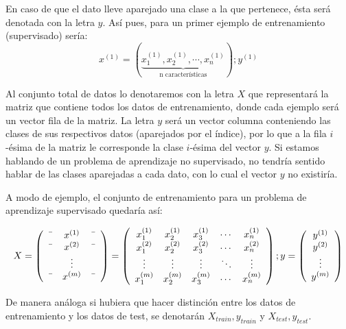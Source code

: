 En caso de que el dato lleve aparejado una clase a la que pertenece, ésta será denotada con la letra 
$y$. Así pues, para un primer ejemplo de entrenamiento (supervisado) sería:
$$ x^{(1)}=(\underbrace{x^{(1)}_1, x^{(1)}_2, \cdots, x^{(1)}_n}_{\text{n características}}); y^{(1)} $$

Al conjunto total de datos lo denotaremos con la letra $X$ que representará la matriz que contiene
todos los datos de entrenamiento, donde cada ejemplo será un vector fila de la matriz.
La letra $y$ será un vector columna conteniendo las clases de sus respectivos datos (aparejados por el índice), 
por lo que a la fila $i$-ésima de la matriz le corresponde la clase $i$-ésima del vector $y$.
Si estamos hablando de un problema de aprendizaje no supervisado, no tendría sentido hablar de las clases 
aparejadas a cada dato, con lo cual el vector $y$ no existiría.

A modo de ejemplo, el conjunto de entrenamiento para un problema de aprendizaje supervisado quedaría así:

$$
X = \left(\begin{array}{ccc}
    \textemdash & x^{(1)} & \textemdash \\
    \textemdash & x^{(2)} & \textemdash \\
     & \vdots &  \\
    \textemdash & x^{(m)} & \textemdash \\
\end{array}\right)
%
=
  \left(\begin{array}{ccccc}
    x^{(1)}_1 & x^{(1)}_2 & x^{(1)}_3 & \cdots & x^{(1)}_n \\
    x^{(2)}_1 & x^{(2)}_2 & x^{(2)}_3 & \cdots & x^{(2)}_n \\
    \vdots & \vdots & \vdots & \ddots & \vdots \\
    x^{(m)}_1 & x^{(m)}_2 & x^{(m)}_3 & \cdots & x^{(m)}_n \\
\end{array}\right)
%
;
y = \left(\begin{array}{c}
    y^{(1)} \\
    y^{(2)} \\
    \vdots \\
    y^{(m)} \\
\end{array}\right)
$$

De manera análoga si hubiera que hacer distinción entre los datos de entrenamiento y los datos de test, 
se denotarán $X_{train}, y_{train}$ y $X_{test}, y_{test}$.


